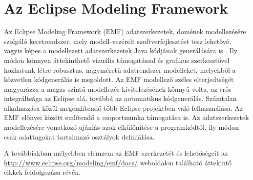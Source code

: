 \section{Az Eclipse Modeling Framework}

Az Eclipse Modeling Framework (\gls{EMF}) adatszerkezetek, domének modellezésére szolgáló keretrendszer, mely modell-vezérelt szoftverfejlesztést tesz lehetővé, vagyis képes a modellezett adatszerkezetek Java kódjának generálására is \cite{VogelEMF}.
Ily módon könnyen áttekinthető vizuális támogatással és grafikus szerkesztővel hozhatunk létre robusztus, nagyméretű adatrendszer modelleket, melyekből a közvetlen kódgenerálás is megoldott.
Az \gls{EMF} modellező széles elterjedtségét magyarázza a magas szintű modellezés kivitelezésének könnyű volta, az erős integráltsága az Eclipse alá, továbbá az automatikus kódgenerálás.
Számtalan alkalmazása közül megemlítendő több Eclipse projektben való felhasználása.
Az \gls{EMF} előnyei között említendő a csoportmunka támogatása is.
Az adatszerkezetek modellezésére vonatkozó ajánlás azok elkülönítése a programkódtól, ily módon csak adattagokat tartalmazó osztályok definiálása.

A továbbiakban mélyebben elemzem az \gls{EMF} szerkezetét és lehetőségeit az \url{http://www.eclipse.org/modeling/emf/docs/} weboldalon található áttekintő cikkek \cite{Steinberg:2009:EEM:1197540,VogelEMF} feldolgozása révén.

